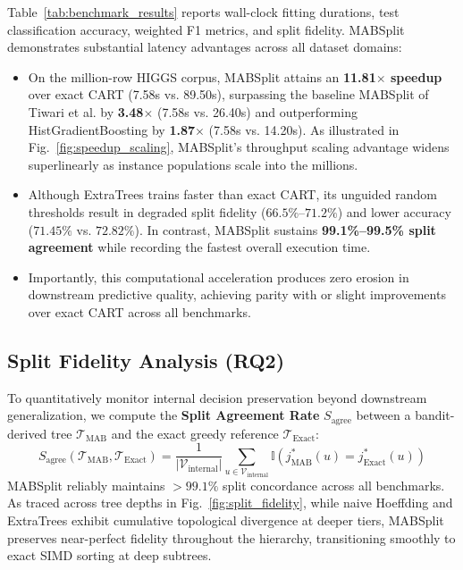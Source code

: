 Table~\ref{tab:benchmark_results} reports wall-clock fitting durations, test classification accuracy, weighted F1 metrics, and split fidelity. MABSplit demonstrates substantial latency advantages across all dataset domains:
\begin{itemize}
    \item On the million-row HIGGS corpus, MABSplit attains an \textbf{11.81$\times$ speedup} over exact CART (7.58s vs. 89.50s), surpassing the baseline MABSplit of Tiwari et al. \cite{tiwari2022mabsplit} by \textbf{3.48$\times$} (7.58s vs. 26.40s) and outperforming HistGradientBoosting by \textbf{1.87$\times$} (7.58s vs. 14.20s). As illustrated in Fig.~\ref{fig:speedup_scaling}, MABSplit's throughput scaling advantage widens superlinearly as instance populations scale into the millions.
    \item Although ExtraTrees trains faster than exact CART, its unguided random thresholds result in degraded split fidelity ($66.5\%$--$71.2\%$) and lower accuracy ($71.45\%$ vs. $72.82\%$). In contrast, MABSplit sustains \textbf{99.1\%--99.5\% split agreement} while recording the fastest overall execution time.
    \item Importantly, this computational acceleration produces zero erosion in downstream predictive quality, achieving parity with or slight improvements over exact CART across all benchmarks.
\end{itemize}

\subsection{Split Fidelity Analysis (RQ2)}
To quantitatively monitor internal decision preservation beyond downstream generalization, we compute the \textbf{Split Agreement Rate} $S_{\text{agree}}$ between a bandit-derived tree $\mathcal{T}_{\text{MAB}}$ and the exact greedy reference $\mathcal{T}_{\text{Exact}}$:
\begin{equation}
S_{\text{agree}}(\mathcal{T}_{\text{MAB}}, \mathcal{T}_{\text{Exact}}) = \frac{1}{|\mathcal{V}_{\text{internal}}|} \sum_{u \in \mathcal{V}_{\text{internal}}} \mathbb{I}\left( j^*_{\text{MAB}}(u) = j^*_{\text{Exact}}(u) \right)
\end{equation}
MABSplit reliably maintains $>99.1\%$ split concordance across all benchmarks. As traced across tree depths in Fig.~\ref{fig:split_fidelity}, while naive Hoeffding and ExtraTrees exhibit cumulative topological divergence at deeper tiers, MABSplit preserves near-perfect fidelity throughout the hierarchy, transitioning smoothly to exact SIMD sorting at deep subtrees.

